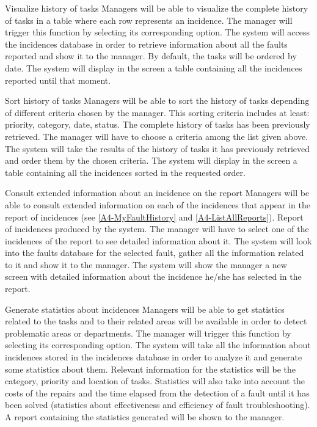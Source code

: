 \begin{requirement}{Visualize history of tasks}
\reqdesc Managers will be able to visualize the complete
history of tasks in a table where each row represents an incidence.
\reqin The manager will trigger this function by selecting its corresponding option.
\reqsteps The system will access the incidences database in order to retrieve information about all the faults reported and show it to the manager. By default, the tasks will be ordered by date.
\reqout The system will display in the screen a table containing all the incidences reported until that moment.
\end{requirement}

\begin{requirement}{Sort history of tasks}
\reqdesc Managers will be able to sort the history of tasks depending of different criteria chosen by the manager. This sorting criteria includes at least: priority, category, date, status.
\reqin The complete history of tasks has been previously retrieved. The manager will have to choose a criteria among the list given above.
\reqsteps The system will take the results of the history of tasks it has previously retrieved and order them by the chosen criteria.
\reqout The system will display in the screen a table containing all the incidences sorted in the requested order.
\end{requirement}

\begin{requirement}{Consult extended information about an incidence on the report}
\reqdesc Managers will be able to consult extended information on each of the incidences that appear in the report of incidences (see \ref{A4-MyFaultHistory} and \ref{A4-ListAllReports}).
\reqin Report of incidences produced by the system. The manager will have to select one of the incidences of the report to see detailed information about it.
\reqsteps The system will look into the faults database for the selected fault, gather all the information related to it and show it to the manager.
\reqout The system will show the manager a new screen with detailed information about the incidence he/she has selected in the report.
\end{requirement}

\begin{requirement}{Generate statistics about incidences}
\reqdesc Managers will be able to get statistics related to the tasks and to their related areas will be available in order to
detect problematic areas or departments.
\reqin The manager will trigger this function by selecting its corresponding option.
\reqsteps The system will take all the information about incidences stored in the incidences database in order to analyze it and generate some statistics about them. Relevant information for the statistics will be the category, priority and location of tasks. Statistics will also take into account the costs of the repairs and the time elapsed from the detection of a fault until it has been solved (statistics about effectiveness and efficiency of fault troubleshooting).
\reqout A report containing the statistics generated will be shown to the manager.
\end{requirement}

